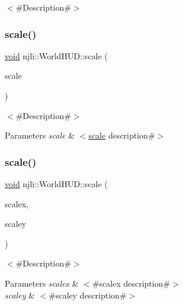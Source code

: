 $<$\#\+Description\#$>$ \mbox{\label{classnjli_1_1_world_h_u_d_a7db32bf294c4d55958d43188457bd866}} 
\subsubsection{\texorpdfstring{scale()}{scale()}\hspace{0.1cm}{\footnotesize\ttfamily [1/2]}}
{\footnotesize\ttfamily \mbox{\hyperlink{_thread_8h_af1e856da2e658414cb2456cb6f7ebc66}{void}} njli\+::\+World\+H\+U\+D\+::scale (\begin{DoxyParamCaption}\item[{const bt\+Vector2 \&}]{scale }\end{DoxyParamCaption})}

$<$\#\+Description\#$>$


\begin{DoxyParams}{Parameters}
{\em scale} & $<$\mbox{\hyperlink{classnjli_1_1_world_h_u_d_a7db32bf294c4d55958d43188457bd866}{scale}} description\#$>$ \\
\hline
\end{DoxyParams}
\mbox{\label{classnjli_1_1_world_h_u_d_a14be92646f0a40e08b738dd0a3492329}} 
\subsubsection{\texorpdfstring{scale()}{scale()}\hspace{0.1cm}{\footnotesize\ttfamily [2/2]}}
{\footnotesize\ttfamily \mbox{\hyperlink{_thread_8h_af1e856da2e658414cb2456cb6f7ebc66}{void}} njli\+::\+World\+H\+U\+D\+::scale (\begin{DoxyParamCaption}\item[{\mbox{\hyperlink{_util_8h_a5f6906312a689f27d70e9d086649d3fd}{f32}}}]{scalex,  }\item[{\mbox{\hyperlink{_util_8h_a5f6906312a689f27d70e9d086649d3fd}{f32}}}]{scaley }\end{DoxyParamCaption})}

$<$\#\+Description\#$>$


\begin{DoxyParams}{Parameters}
{\em scalex} & $<$\#scalex description\#$>$ \\
\hline
{\em scaley} & $<$\#scaley description\#$>$ \\
\hline
\end{DoxyParams}
\mbox{\label{classnjli_1_1_world_h_u_d_a40f16dae5cfeec69081899c6e9e251f2}} 
